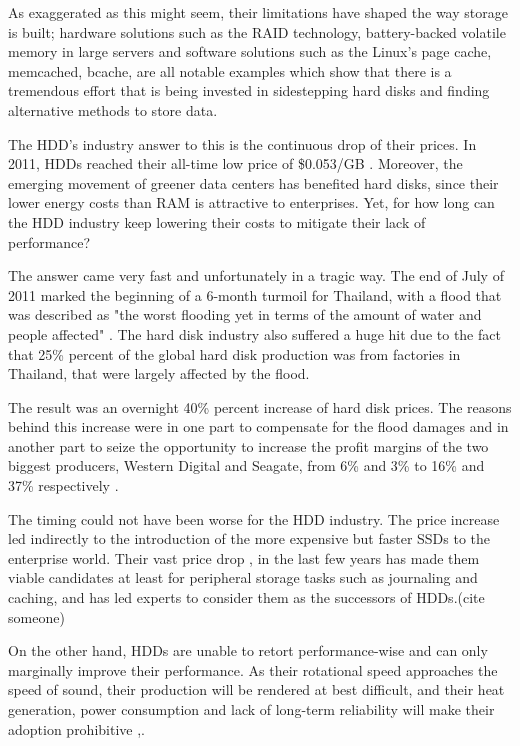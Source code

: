 As exaggerated as this might seem, their limitations have shaped the way 
storage is built; hardware solutions such as the RAID technology, 
battery-backed volatile memory in large servers and software solutions such as 
the Linux's page cache, memcached, bcache, are all notable examples which show 
that there is a tremendous effort that is being invested in sidestepping hard 
disks and finding alternative methods to store data.

The HDD's industry answer to this is the continuous drop of their prices.  In 
2011, HDDs reached their all-time low price of \$0.053/GB \cite{hdd-price}.  
Moreover, the emerging movement of greener data centers has benefited hard 
disks, since their lower energy costs than RAM is attractive to enterprises.  
Yet, for how long can the HDD industry keep lowering their costs to mitigate 
their lack of performance?

The answer came very fast and unfortunately in a tragic way. The end of July of 
2011 marked the beginning of a 6-month turmoil for Thailand, with a flood that 
was described as "the worst flooding yet in terms of the amount of water and 
people affected" \cite{flood}. The hard disk industry also suffered a huge hit 
due to the fact that 25\% percent of the global hard disk production was from 
factories in Thailand, that were largely affected by the flood.

The result was an overnight 40\% percent increase of hard disk prices. The 
reasons behind this increase were in one part to compensate for the flood 
damages and in another part to seize the opportunity to increase the profit 
margins of the two biggest producers, Western Digital and Seagate, from 6\% and 
3\% to 16\% and 37\% respectively \cite{rosenthal12-unesco}.

The timing could not have been worse for the HDD industry. The price increase 
led indirectly to the introduction of the more expensive but faster SSDs to the 
enterprise world. Their vast price drop \cite{ssd-price},\cite{ssddrop} in the 
last few years has made them viable candidates at least for peripheral storage 
tasks such as journaling and caching, and has led experts to consider them as 
the successors of HDDs.(\fixme cite someone)

On the other hand, HDDs are unable to retort performance-wise and can only 
marginally improve their performance.  As their rotational speed approaches the 
speed of sound, their production will be rendered at best difficult, and their 
heat generation, power consumption and lack of long-term reliability will make 
their adoption prohibitive \cite{hddtrends},\cite{speed-of-sound}.

